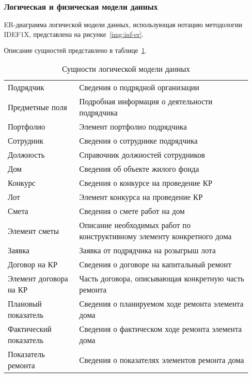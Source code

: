 \subsubsection{Логическая и физическая модели данных}

ER-диаграмма логической модели данных, использующая нотацию методологии IDEF1X, представлена на рисунке~\ref{img:inf-er}.


Описание сущностей представлено в таблице~\ref{tab:inf-entities}.

\begin{footnotesize}
\begin{longtable}[h]{|p{}|p{}|}
	\caption{\label{tab:inf-entities}Сущности логической модели данных} \\
	\hline
		\thead{Название сущности} &
		\thead{Описание} \\
	\hline \endhead
		Подрядчик & Сведения о подрядной организации \\ \hline
		Предметные поля & Подробная информация о деятельности подрядчика \\ \hline
		Портфолио & Элемент портфолио подрядчика \\ \hline
		Сотрудник & Сведения о сотруднике подрядчика \\ \hline
		Должность & Справочник должностей сотрудников \\ \hline
		Дом & Сведения об объекте жилого фонда \\ \hline
		Конкурс & Сведения о конкурсе на проведение КР \\ \hline
		Лот & Элемент конкурса на проведение КР \\ \hline
		Смета & Сведения о смете работ на дом \\ \hline
		Элемент сметы & Описание необходимых работ по конструктивному элементу конкретного дома \\ \hline
		Заявка & Заявка от подрядчика на розыгрыш лота \\ \hline
		Договор на КР & Сведения о договоре на капитальный ремонт \\ \hline
		Элемент договора на КР & Часть договора, описывающая конкретную часть ремонта \\ \hline
		Плановый показатель & Сведения о планируемом ходе ремонта элемента дома \\ \hline
		Фактический показатель & Сведения о фактическом ходе ремонта элемента дома \\ \hline
		Показатель ремонта & Сведения о показателях элементов ремонта дома \\ \hline
\end{longtable}
\end{footnotesize}

